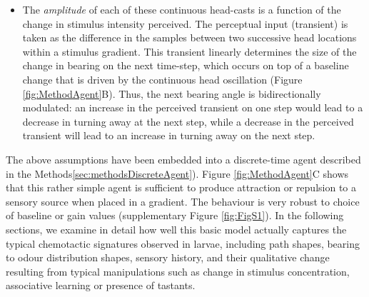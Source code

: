 \documentclass[11pt,a4paper]{article}
\newcommand{\todoBW}[1]{\todo[author=BW,color=orange, size=\tiny,inline]{#1}}
\begin{document}
\begin{itemize}
\item The {\it amplitude} of each of these continuous head-casts is a function of the change in stimulus intensity perceived. %
 The perceptual input (transient) is taken as the difference in the samples between two successive head locations within a stimulus gradient. This transient linearly determines the size of the change in bearing on the next time-step, which occurs on top of a baseline change that is driven by the continuous head oscillation (Figure \ref{fig:MethodAgent}B). Thus, the next bearing angle is bidirectionally modulated:
an increase in the perceived transient on one step would lead to a decrease in turning away at the next step, while a decrease in the perceived transient will lead to an increase in turning away on the next step.
\end{itemize}

The above assumptions have been embedded into a discrete-time agent described in the Methods\ref{sec:methodsDiscreteAgent}). Figure \ref{fig:MethodAgent}C shows that this rather simple agent is sufficient to produce attraction or repulsion
 to a sensory source when placed in a gradient.  The behaviour is very robust to choice of baseline or gain values (supplementary Figure \ref{fig:FigS1}). In the following sections, we examine in detail how well this basic model actually captures the typical chemotactic signatures observed in larvae, including path shapes, bearing to odour distribution shapes, sensory history, and their qualitative change resulting from typical manipulations such as change in stimulus concentration, associative learning or presence of tastants.
\end{document}
